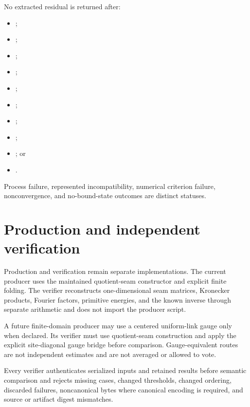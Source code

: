 \documentclass[11pt]{article}
\begin{document}
No extracted residual is returned after:
\begin{itemize}[leftmargin=*]
  \item {};
  \item {};
  \item {};
  \item {};
  \item {};
  \item {};
  \item {};
  \item {};
  \item {}; or
  \item {}.
\end{itemize}
Process failure, represented incompatibility, numerical criterion failure,
nonconvergence, and no-bound-state outcomes are distinct statuses.

\section{Production and independent verification}

Production and verification remain separate implementations.  The current producer uses
the maintained quotient-seam constructor and explicit finite folding.  The verifier
reconstructs one-dimensional seam matrices, Kronecker products, Fourier factors,
primitive energies, and the known inverse through separate arithmetic and does not
import the producer script.

A future finite-domain producer may use a centered uniform-link gauge only when declared.
Its verifier must use quotient-seam construction and apply the explicit site-diagonal
gauge bridge before comparison.  Gauge-equivalent routes are not independent estimates
and are not averaged or allowed to vote.

Every verifier authenticates serialized inputs and retained results before semantic
comparison and rejects missing cases, changed thresholds, changed ordering, discarded
failures, noncanonical bytes where canonical encoding is required, and source or
artifact digest mismatches.
\end{document}
